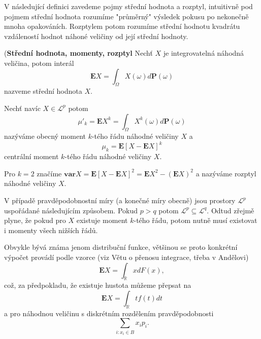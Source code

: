 V následující definici zavedeme pojmy střední hodnota a rozptyl, intuitivně pod pojmem střední hodnota rozumíme "průměrný" výsledek pokusu po nekonečně mnoha opakováních. Rozptylem potom rozumíme střední hodnotu kvadrátu vzdáleností hodnot náhoné veličiny od její střední hodnoty.
\begin{definition}{(\textbf{Střední hodnota, momenty, rozptyl}}
Nechť $X$ je integrovatelná náhodná veličina, potom interál
\begin{equation}
\textbf{E}X = \int_{\Omega}X(\omega) d\textbf{P}(\omega)
\end{equation} 
nazveme střední hodnota $X$.

Nechť navíc $X \in \mathcal{L}^{p}$ potom 
\begin{equation}
\mu'_{k}=\textbf{E}X^{k}=\int_{\Omega}X^{k}(\omega) d\textbf{P}(\omega) 
\end{equation}
nazýváme obecný moment $k$-tého řádu náhodné veličiny $X$ a 
\begin{equation}
\mu_{k} = \mathbf{E}[X - \mathbf{E}X]^{k}
\end{equation}
centrální moment $k$-tého řádu náhodné veličiny $X$.

Pro $k = 2$ značíme $\mathbf{var}X = \mathbf{E}[X - \mathbf{E}X]^{2} = \mathbf{E}X^{2} - (\mathbf{E}X)^{2}$ a nazýváme rozptyl náhodné veličiny $X$.
\end{definition}
\begin{remark}
V případě pravděpodobnostní míry (a konečné míry obecně) jsou prostory $\mathcal{L}^{p}$ uspořádané následujícím způsobem. Pokud $p > q$ potom $\mathcal{L}^{p} \subseteq \mathcal{L}^{q}$. Odtud zřejmě plyne, že pokud pro $X$ existuje moment $k$-tého řádu, potom nutně musí existovat i momenty všech nižších řádů.
\end{remark}
\begin{remark}
Obvykle bývá známa jenom distribuční funkce, většinou se proto konkrétní výpočet provádí podle vzorce (viz Větu o přenosu integrace, třeba v Andělovi) 
\begin{equation}
\mathbf{E}X = \int_{\mathbb{R}}xdF(x),
\end{equation}
což, za předpokladu, že existuje hustota můžeme přepsat na
\begin{equation}
\mathbf{E}X = \int_{\mathbb{R}}tf(t)dt
\end{equation}
a pro náhodnou veličinu s diskrétním rozdělením pravděpodobnosti
\begin{equation}
\sum_{i: x_{i}\in B}x_{i}p_{i}.
\end{equation}
\end{remark}

